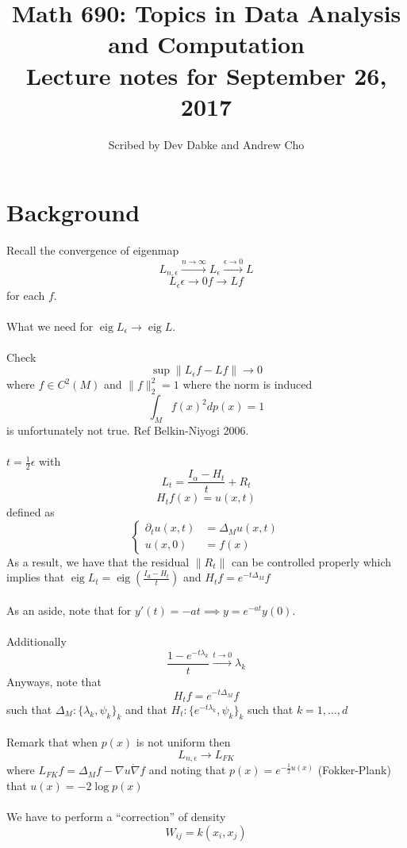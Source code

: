 \documentclass[12pt]{article}
\title{Math 690: Topics in Data Analysis and Computation \\
Lecture notes for September 26, 2017}
\date{}
\author{Scribed by Dev Dabke and Andrew Cho}
\theoremstyle{plain}
\DeclareMathOperator*{\eig}{eig}
\begin{document}
\maketitle

\section{Background}
Recall the convergence of eigenmap
\[
L_{n, \epsilon} \xrightarrow{n\to\infty} L_{\epsilon} \xrightarrow{\epsilon \to 0} L
\]
\[
L_{\epsilon} \epsilon\to 0 f \to Lf
\]
for each $ f $.
\\ \\
What we need for $ \eig{L_{\epsilon}} \to \eig{L} $.
\\ \\
Check
\[
\sup { \| L_{\epsilon} f - L f \| } \to 0
\]
where $ f \in C^2 (M) $ and $ \| f \|_2^2 = 1 $
where the norm is induced
\[
\int_M {f(x)}^2 dp(x) = 1
\]
is unfortunately not true.
Ref Belkin-Niyogi 2006.
\\ \\
$ t = \frac{1}{2} \epsilon $
with
\[
L_t = \frac{I_{\alpha} - H_t}{t} + R_t
\]
\[
H_t f(x) = u(x, t)
\]
defined as
\[
\begin{cases}
    \partial_t u(x, t) &= \Delta_M u(x, t) \\
    u(x, 0) &= f(x)
\end{cases}
\]
As a result, we have that the residual $ \| R_t \| $ can be controlled properly
which implies that $ \eig{L_t} = \eig{( \frac{I_d - H_t}{t} )} $
and $ H_t f = e^{-t \Delta_M} f $
\\ \\
As an aside, note that for $ y'(t) = -at \implies y = e^{-at} y(0) $.
\\ \\
Additionally
\[
\frac{1 - e^{-t\lambda_k}}{t} \xrightarrow{t \to 0} \lambda_k
\]
Anyways, note that
\[
H_t f = e^{-t \Delta_M} f
\]
such that $ \Delta_M : \{ \lambda_k, \psi_k \}_k $
and that $ H_t : \{ e^{-t \lambda_k}, \psi_k \}_k $
such that $ k = 1, \ldots, d $
\\ \\
Remark that when $ p(x) $ is not uniform then
\[
L_{n, \epsilon} \to L_{FK}
\]
where $ L_{FK} f = \Delta_M f - \nabla u \dot \nabla f $
and noting that $ p(x) = e^{-\frac{1}{2} u(x)} $
(Fokker-Plank) that $ u(x) = -2 \log{p(x)} $
\\ \\
We have to perform a ``correction'' of density
\[
W_{ij} = k(x_i, x_j)
\]
\end{document}
